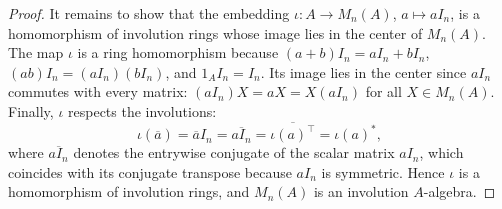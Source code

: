 \begin{proof}
    It remains to show that the embedding $\iota: A \to M_n(A)$, $a \mapsto a I_n$, is a homomorphism of involution rings whose image lies in the center of $M_n(A)$. The map $\iota$ is a ring homomorphism because $(a+b)I_n = aI_n + bI_n$, $(ab)I_n = (aI_n)(bI_n)$, and $1_A I_n = I_n$. Its image lies in the center since $a I_n$ commutes with every matrix: $(a I_n) X = a X = X (a I_n)$ for all $X \in M_n(A)$. Finally, $\iota$ respects the involutions:
    $$\iota(\overline{a}) = \overline{a} I_n = \overline{a I_n} = \overline{\iota(a)^\top} = \iota(a)^*,$$
    where $\overline{a I_n}$ denotes the entrywise conjugate of the scalar matrix $a I_n$, which coincides with its conjugate transpose because $a I_n$ is symmetric. Hence $\iota$ is a homomorphism of involution rings, and $M_n(A)$ is an involution $A$-algebra.
\end{proof}